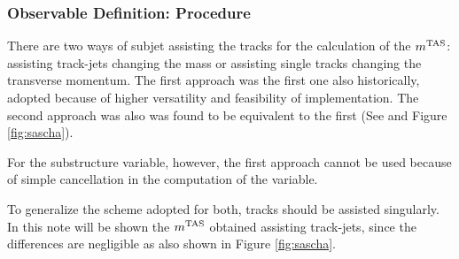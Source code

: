 \subsubsection{Observable Definition: Procedure}


There are two ways of subjet assisting the tracks for the calculation of the $m^\textrm{TAS}$: assisting track-jets changing the mass or assisting single tracks changing the transverse momentum. The first approach was the first one also historically, adopted because of higher versatility and feasibility of implementation. The second approach was also was found to be equivalent to the first (See \cite{presentation} and Figure \ref{fig:sascha}).

For the substructure variable, however, the first approach cannot be used because of simple cancellation in the computation of the variable.

To generalize the scheme adopted for both, tracks should be assisted singularly. In this note will be shown the $m^\textrm{TAS}$ obtained assisting track-jets, since the differences are negligible as also shown in Figure \ref{fig:sascha}.

